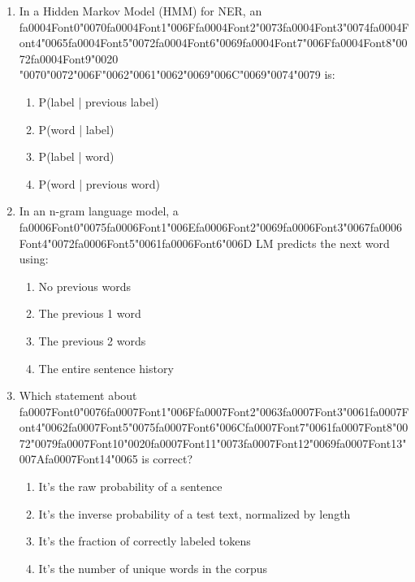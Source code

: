 \documentclass[12pt]{article}
\begin{document}
\begin{enumerate}[label=Q\arabic*.]
\item In a Hidden Markov Model (HMM) for NER, an {\csname fa0004Font0\endcsname\char"0070}{\csname fa0004Font1\endcsname\char"006F}{\csname fa0004Font2\endcsname\char"0073}{\csname fa0004Font3\endcsname\char"0074}{\csname fa0004Font4\endcsname\char"0065}{\csname fa0004Font5\endcsname\char"0072}{\csname fa0004Font6\endcsname\char"0069}{\csname fa0004Font7\endcsname\char"006F}{\csname fa0004Font8\endcsname\char"0072}{\csname fa0004Font9\endcsname\char"0020} {\char"0070}{\char"0072}{\char"006F}{\char"0062}{\char"0061}{\char"0062}{\char"0069}{\char"006C}{\char"0069}{\char"0074}{\char"0079} is:
\begin{enumerate}[label=(\Alph*)]
    \item P(label | previous label)
    \item P(word | label)
    \item P(label | word)
    \item P(word | previous word)
\end{enumerate}
\item In an n-gram language model, a {\csname fa0006Font0\endcsname\char"0075}{\csname fa0006Font1\endcsname\char"006E}{\csname fa0006Font2\endcsname\char"0069}{\csname fa0006Font3\endcsname\char"0067}{\csname fa0006Font4\endcsname\char"0072}{\csname fa0006Font5\endcsname\char"0061}{\csname fa0006Font6\endcsname\char"006D} LM predicts the next word using:
\begin{enumerate}[label=(\Alph*)]
    \item No previous words
    \item The previous 1 word
    \item The previous 2 words
    \item The entire sentence history
\end{enumerate}
\item Which statement about {\csname fa0007Font0\endcsname\char"0076}{\csname fa0007Font1\endcsname\char"006F}{\csname fa0007Font2\endcsname\char"0063}{\csname fa0007Font3\endcsname\char"0061}{\csname fa0007Font4\endcsname\char"0062}{\csname fa0007Font5\endcsname\char"0075}{\csname fa0007Font6\endcsname\char"006C}{\csname fa0007Font7\endcsname\char"0061}{\csname fa0007Font8\endcsname\char"0072}{\char"0079}{\csname fa0007Font10\endcsname\char"0020}{\csname fa0007Font11\endcsname\char"0073}{\csname fa0007Font12\endcsname\char"0069}{\csname fa0007Font13\endcsname\char"007A}{\csname fa0007Font14\endcsname\char"0065} is correct?
\begin{enumerate}[label=(\Alph*)]
    \item It's the raw probability of a sentence
    \item It's the inverse probability of a test text, normalized by length
    \item It's the fraction of correctly labeled tokens
    \item It's the number of unique words in the corpus
\end{enumerate}
\end{enumerate}
\end{document}
